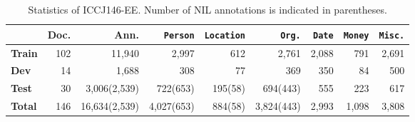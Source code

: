 \begin{table}[tb]
\caption[Statistics of ICCJ146-EE.]{Statistics of ICCJ146-EE. Number of NIL annotations is indicated in parentheses.}
\centering
\label{tab:dataset_stats}
\begin{tabular*}{\textwidth}{l@{\extracolsep{\fill}}rrrrrrrr}
\toprule
      & \textbf{Doc.} & \textbf{Ann.} & \texttt{Person}    & \texttt{Location} & \texttt{Org.} & \texttt{Date} & \texttt{Money} & \texttt{Misc.} \\
      \midrule
\textbf{Train} & 102    & 11,940         & 2,997      & 612         &  2,761     & 2,088 & 791   & 2,691 \\
\textbf{Dev}   & 14     & 1,688          & 308        & 77           &  369      & 350   & 84    & 500  \\
\textbf{Test}  & 30     & 3,006(2,539)   & 722(653)   & 195(58)      &  694(443)  & 555   & 223   & 617 \\
\midrule
\textbf{Total} & 146 & 16,634(2,539)     & 4,027(653) & 884(58) &  3,824(443) & 2,993 & 1,098 & 3,808 \\
\bottomrule
\end{tabular*}
\end{table}
